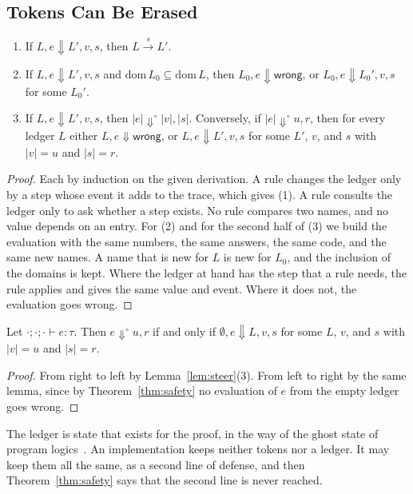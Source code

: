 \documentclass[acmsmall,nonacm,screen]{acmart}
\newcommand{\kw}[1]{\mathsf{#1}}
\newcommand{\wrong}{\kw{wrong}}
\newcommand{\dom}{\mathrm{dom}\,}
\newcommand{\evto}{\Downarrow}
\newcommand{\lstep}[1]{\xrightarrow{\,#1\,}}
\newcommand{\er}[1]{|#1|}
\begin{document}
\subsection{Tokens Can Be Erased}

\begin{lemma}
\label{lem:steer}
\begin{enumerate}
\item If $L, e \evto L', v, s$, then $L \lstep{s} L'$.
\item If $L, e \evto L', v, s$ and $\dom L_0 \subseteq \dom L$, then $L_0, e \evto \wrong$, or
  $L_0, e \evto L_0', v, s$ for some $L_0'$.
\item If $L, e \evto L', v, s$, then $\er{e} \evto^{\circ} \er{v}, \er{s}$. Conversely, if
  $\er{e} \evto^{\circ} u, r$, then for every ledger $L$ either $L, e \evto \wrong$, or
  $L, e \evto L', v, s$ for some $L'$, $v$, and $s$ with $\er{v} = u$ and $\er{s} = r$.
\end{enumerate}
\end{lemma}

\begin{proof}
Each by induction on the given derivation. A rule changes the ledger only by a step whose
event it adds to the trace, which gives (1). A rule consults the ledger only to ask whether a
step exists. No rule compares two names, and no value depends on an entry. For (2) and for the
second half of (3) we build the evaluation with the same numbers, the same answers, the same
code, and the same new names. A name that is new for $L$ is new for $L_0$, and the inclusion of
the domains is kept. Where the ledger at hand has the step that a rule needs, the rule
applies and gives the same value and event. Where it does not, the evaluation goes wrong.
\end{proof}

\begin{theorem}[Erasure]
\label{thm:erasure}
Let $\cdot; \cdot; \cdot \vdash e : \tau$. Then $e \evto^{\circ} u, r$ if and only if
$\emptyset, e \evto L, v, s$ for some $L$, $v$, and $s$ with $\er{v} = u$ and $\er{s} = r$.
\end{theorem}

\begin{proof}
From right to left by Lemma~\ref{lem:steer}(3). From left to right by the same lemma, since
by Theorem~\ref{thm:safety} no evaluation of $e$ from the empty ledger goes wrong.
\end{proof}

The ledger is state that exists for the proof, in the way of the ghost state of program
logics~\citep{jung2018}. An implementation keeps neither tokens nor a ledger. It may keep
them all the same, as a second line of defense, and then Theorem~\ref{thm:safety} says that the
second line is never reached.
\end{document}

